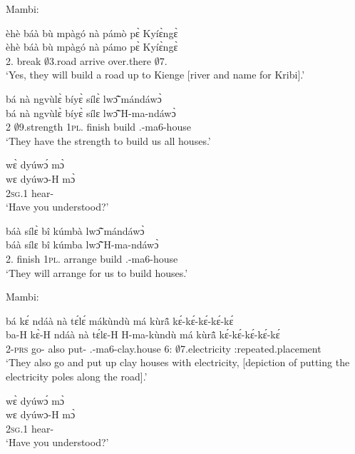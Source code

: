 \noindent Mambi:

\begin{exe}[(C234)] 
\exC\label{199} 
  \glll èhè báà bù mpàgó nà pámò pɛ̀ Kyíɛ̀ngɛ̀ \\
        èhè báà bù mpàgó nà pámo pɛ̀ Kyíɛ̀ngɛ̀ \\
        {\EXCL} 2.{\FUT} break $\emptyset$3.road {\COM} arrive over.there $\emptyset$7.{\PN}  \\
    \trans `Yes, they will build a road up to Kienge [river and name for Kribi].'
 
\exC\label{200}
  \glll bá nà ngvùlɛ̀ bíyɛ̀ sílɛ̀ lwɔ̃̂ mándáwɔ̀ \\
        bá nà ngvùlɛ̀ bíyɛ̀ sílɛ lwɔ̃̂ H-ma-ndáwɔ̀ \\
        2 {\COM}  $\emptyset$9.strength 1\textsc{pl}.{\OBJ} finish build {\OBJ}.{\LINK}-ma6-house \\
    \trans `They have the strength to build us all houses.'
 
\exC\label{201}
  \glll wɛ̀ dyúwɔ́ mɔ̀ \\
       wɛ dyúwɔ-H mɔ̀ \\
      2\textsc{sg}.{\PST}1 hear-{\R} {\COMPL}   \\
    \trans `Have you understood?'
 
\exC\label{202}
  \glll báà sílɛ̀ bî kúmbà lwɔ̃̂ mándáwɔ̀ \\
        báà sílɛ bî kúmba lwɔ̃̂ H-ma-ndáwɔ̀ \\
        2.{\FUT} finish 1\textsc{pl}.{\OBJ} arrange build {\OBJ}.{\LINK}-ma6-house  \\
    \trans `They will arrange for us to build houses.'
\end{exe}

\noindent Mambi:

\begin{exe}[(C234)]  
\exC\label{203} 
  \glll  bá kɛ́ ndáà nà tɛ́lɛ́ mákùndù má kùrã̂  kɛ́-kɛ́-kɛ́-kɛ́-kɛ́\\
         ba-H kɛ̀-H ndáà nà tɛ́lɛ-H H-ma-kùndù má kùrã̂  kɛ́-kɛ́-kɛ́-kɛ́-kɛ́ \\
        2-\textsc{prs} go-{\R} also {\CONJ} put-{\R} {\OBJ}.{\LINK}-ma6-clay.house 6:{\ATT}  $\emptyset$7.electricity {\IDEO}:repeated.placement \\
    \trans `They also go and put up clay houses with electricity, [depiction of putting the electricity poles along the road].'
 
\exC\label{204}
  \glll wɛ̀ dyúwɔ́ mɔ̀ \\
       wɛ dyúwɔ-H mɔ̀ \\
        2\textsc{sg}.{\PST}1 hear-{\R} {\COMPL}  \\
    \trans `Have you understood?'
\end{exe}

